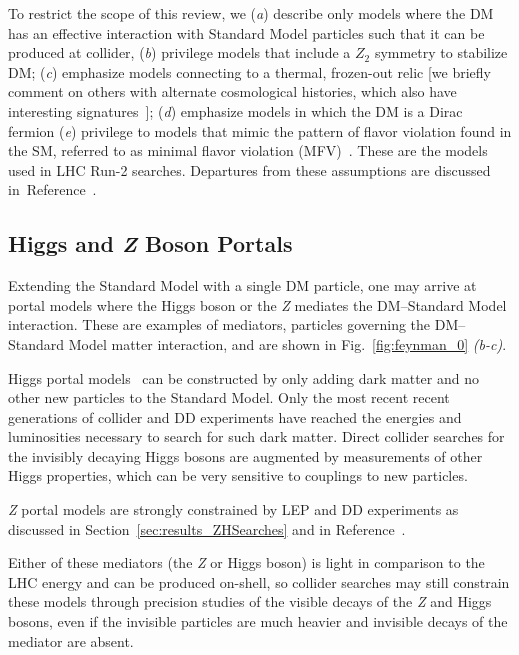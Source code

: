 \documentclass{ar-1col}
\newcommand{\IP}{invisible particle}
\begin{document}
To restrict the scope of this review,
we (\textit{a}) describe only models where the DM has an effective interaction with Standard Model particles
such that it can be produced at collider, 
(\textit{b}) privilege models that include a $Z_2$ symmetry to stabilize DM; 
(\textit{c}) emphasize models connecting to a thermal, frozen-out relic 
[we briefly comment on others with alternate cosmological histories, which also
have interesting signatures~\cite{Bernal:2017kxu,Brooijmans:2018xbu,Evans:2017kti}]; 
(\textit{d}) emphasize models in which the DM is a Dirac fermion
(\textit{e}) privilege to models that mimic the pattern of flavor violation found in the SM, 
referred to as minimal flavor violation (MFV)~\cite{DAmbrosio:2002vsn}. 
These are the models used in LHC Run-2 searches. 
Departures from these assumptions are discussed in~Reference~.

\subsection{Higgs and {\bf \it{Z}} Boson Portals}\label{sec:HZPortalModels}

Extending the Standard Model with a single DM particle, one
may arrive at portal models where the Higgs boson or the \textit{Z} mediates
the DM--Standard Model interaction. 
These are examples of {mediators}, particles governing the DM--Standard Model
matter interaction, and are shown in Fig.~\ref{fig:feynman_0} \textit{(b-c)}.  

{Higgs portal} models~\cite{Patt:2006fw,Djouadi:2011aa} can be constructed by only
adding dark matter and no other new particles to the Standard Model. 
Only the most recent recent generations of collider and DD
experiments have reached the energies and luminosities necessary to
search for such dark matter. Direct collider searches for the
invisibly decaying Higgs bosons are augmented by measurements of
other Higgs properties, which can be very sensitive to couplings
to new particles.

{\textit{Z} portal} models are strongly constrained
by LEP and DD experiments as discussed in
Section~\ref{sec:results_ZHSearches} and
in Reference~. 

Either of these mediators (the \textit{Z} or Higgs boson) is light in
comparison to the LHC energy and can be produced on-shell, so
collider searches may still constrain these models 
through precision studies of the visible decays of the \textit{Z} and Higgs bosons, 
even if the {\IP}s are much heavier and invisible decays of the mediator
are absent. 
\end{document}
